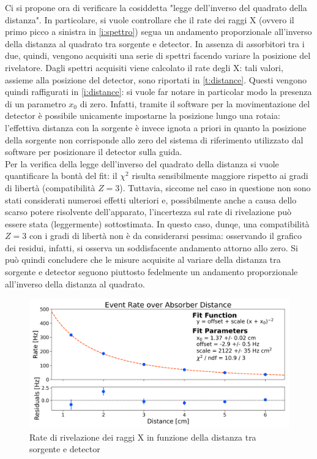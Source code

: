 \documentclass[twocolumn,10pt]{asme2ej}
\begin{document}
Ci si propone ora di verificare la cosiddetta "legge dell'inverso del quadrato della distanza". In particolare, si vuole
controllare che il rate dei raggi X (ovvero il primo picco a sinistra in \autoref{i:spettro}) segua un andamento
proporzionale all'inverso della distanza al quadrato tra sorgente e detector. In assenza di assorbitori tra i due,
quindi, vengono acquisiti una serie di spettri facendo variare la posizione del rivelatore. Dagli spettri acquisiti
viene calcolato il rate degli X: tali valori, assieme alla posizione del detector, sono riportati in
\autoref{t:distance}. Questi vengono quindi raffigurati in \autoref{i:distance}: si vuole far notare in particolar modo
la presenza di un parametro $x_0$ di zero. Infatti, tramite il software per la movimentazione del detector è possibile
unicamente impostarne la posizione lungo una rotaia: l'effettiva distanza con la sorgente è invece ignota a priori in
quanto la posizione della sorgente non corrisponde allo zero del sistema di riferimento utilizzato dal software per
posizionare il detector sulla guida. \\
Per la verifica della legge dell'inverso del quadrato della distanza si vuole quantificare la bontà del fit: il $\chi^2$
risulta sensibilmente maggiore rispetto ai gradi di libertà (compatibilità $Z=3$). Tuttavia, siccome nel caso in
questione non sono stati considerati numerosi effetti ulteriori e, possibilmente anche a causa dello scarso potere
risolvente dell'apparato, l'incertezza sul rate di rivelazione può essere stata (leggermente) sottostimata. In questo
caso, dunqe, una compatibilità $Z=3$ con i gradi di libertà non è da considerarsi pessima: osservando il grafico dei
residui, infatti, si osserva un soddisfacente andamento attorno allo zero. Si può quindi concludere che le misure
acquisite al variare della distanza tra sorgente e detector seguono piuttosto fedelmente un andamento proporzionale
all'inverso della distanza al quadrato. 

\begin{figure}
    \centering
    \includegraphics[width=\linewidth]{../Plots/distance_small.png}
    \caption{Rate di rivelazione dei raggi X in funzione della distanza tra sorgente e detector}
    \label{i:distance}
    \vspace{-10pt}
\end{figure}
\end{document}
